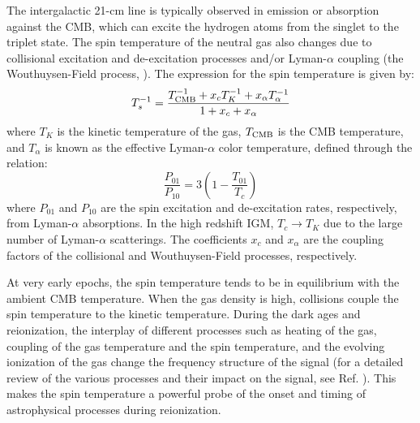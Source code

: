 The intergalactic 21-cm line is typically observed in emission or absorption against the CMB, which can excite the hydrogen atoms from the singlet to the triplet state. The spin temperature of the neutral gas also changes due to collisional excitation and de-excitation processes and/or  Lyman-$\alpha$ coupling (the Wouthuysen-Field process, \cite{wouthuysen1952, field1958}). The expression for the spin temperature is given by:
\begin{equation}
 T_s^{-1} = \frac{T_{\rm CMB}^{-1} + x_c T_{K}^{-1} + x_{\alpha} T_{\alpha}^{-1}}{1 + x_c + x_{\alpha}}
\end{equation} 
where $T_K$ is the kinetic temperature of the gas, $T_{\rm CMB}$ is the CMB temperature, and $T_{\alpha}$ is known as the effective  Lyman-$\alpha$ color temperature, defined through the relation:
\begin{equation}
 \frac{P_{01}}{P_{10}} = 3 \left(1 - \frac{T_{01}}{T_c}\right)
\end{equation} 
where $P_{01}$ and $P_{10}$ are the spin excitation and de-excitation rates, respectively, from Lyman-$\alpha$ absorptions. In the high redshift IGM,  $T_c \to T_K$ due to the large number of Lyman-$\alpha$ scatterings. The coefficients $x_c$ and $x_{\alpha}$ are the coupling factors of the collisional and Wouthuysen-Field processes, respectively.


At very early epochs, the spin temperature tends to be in equilibrium with the ambient CMB temperature. When the gas density is high, collisions couple the spin temperature to the kinetic temperature. During the dark ages and reionization, the interplay of different processes such as heating of the gas, coupling of the gas temperature and the spin temperature, and the evolving ionization of the gas change the frequency structure of the signal (for a detailed review of the various processes and their impact on the signal, see Ref. \cite{furlanettorev}). This makes the spin temperature a powerful probe of the onset and timing of astrophysical processes during reionization.  
 
